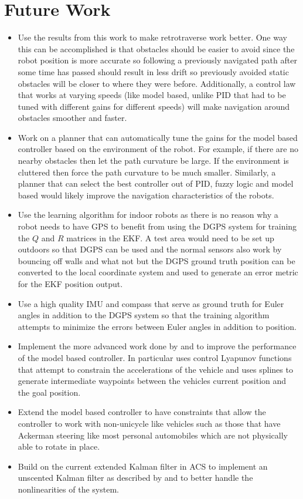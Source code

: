\chapter{Future Work}
\label{ch:futurework}

\begin{itemize}
\item Use the results from this work to make retrotraverse work better. One way this can be accomplished is that obstacles should be easier to avoid since the robot position is more accurate so following a previously navigated path after some time has passed should result in less drift so previously avoided static obstacles will be closer to where they were before. Additionally, a control law that works at varying speeds (like model based, unlike PID that had to be tuned with different gains for different speeds) will make navigation around obstacles smoother and faster.
\item Work on a planner that can automatically tune the gains for the model based controller based on the environment of the robot. For example, if there are no nearby obstacles then let the path curvature be large. If the environment is cluttered then force the path curvature to be much smaller. Similarly, a planner that can select the best controller out of PID, fuzzy logic and model based would likely improve the navigation characteristics of the robots.
\item Use the learning algorithm for indoor robots as there is no reason why a robot needs to have GPS to benefit from using the DGPS system for training the $Q$ and $R$ matrices in the EKF. A test area would need to be set up outdoors so that DGPS can be used and the normal sensors also work by bouncing off walls and what not but the DGPS ground truth position can be converted to the local coordinate system and used to generate an error metric for the EKF position output.
\item Use a high quality IMU and compass that serve as ground truth for Euler angles in addition to the DGPS system so that the training algorithm attempts to minimize the errors between Euler angles in addition to position.
\item Implement the more advanced work done by \cite{Lapierre06} and \cite{Gulati08} to improve the performance of the model based controller. In particular \cite{Gulati08} uses control Lyapunov functions that attempt to constrain the accelerations of the vehicle and uses splines to generate intermediate waypoints between the vehicles current position and the goal position.
\item Extend the model based controller to have constraints that allow the controller to work with non-unicycle like vehicles such as those that have Ackerman steering like most personal automobiles which are not physically able to rotate in place.
\item Build on the current extended Kalman filter in ACS to implement an unscented Kalman filter as described by \cite{ThrunProbRobots06} and \cite{Orderud05} to better handle the nonlinearities of the system.
\end{itemize}
